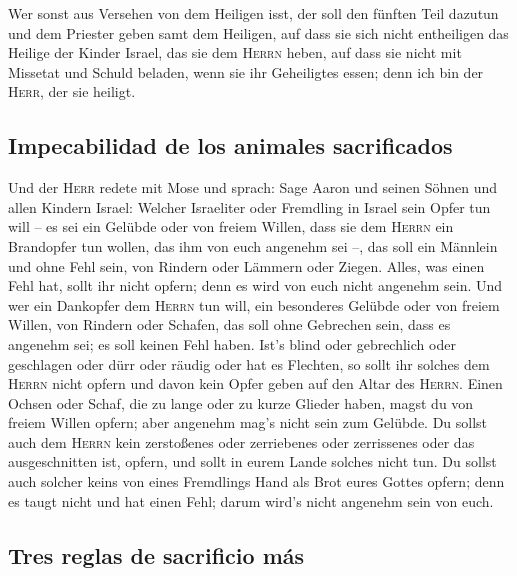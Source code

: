  Wer sonst aus Versehen von dem Heiligen isst, der soll
den fünften Teil dazutun und dem Priester geben samt dem Heiligen,
 auf dass sie sich nicht entheiligen das Heilige der
Kinder Israel, das sie dem \textsc{Herrn} heben,  auf
dass sie nicht mit Missetat und Schuld beladen, wenn sie ihr Geheiligtes
essen; denn ich bin der \textsc{Herr}, der sie heiligt.

\hypertarget{impecabilidad-de-los-animales-sacrificados}{%
\subsection{Impecabilidad de los animales
sacrificados}\label{impecabilidad-de-los-animales-sacrificados}}

 Und der \textsc{Herr} redete mit Mose und sprach:
 Sage Aaron und seinen Söhnen und allen Kindern Israel:
Welcher Israeliter oder Fremdling in Israel sein Opfer tun will -- es
sei ein Gelübde oder von freiem Willen, dass sie dem \textsc{Herrn} ein
Brandopfer tun wollen, das ihm von euch angenehm sei --, 
das soll ein Männlein und ohne Fehl sein, von Rindern oder Lämmern oder
Ziegen.  Alles, was einen Fehl hat, sollt ihr nicht
opfern; denn es wird von euch nicht angenehm sein.  Und
wer ein Dankopfer dem \textsc{Herrn} tun will, ein besonderes Gelübde
oder von freiem Willen, von Rindern oder Schafen, das soll ohne
Gebrechen sein, dass es angenehm sei; es soll keinen Fehl haben.
 Ist's blind oder gebrechlich oder geschlagen oder dürr
oder räudig oder hat es Flechten, so sollt ihr solches dem
\textsc{Herrn} nicht opfern und davon kein Opfer geben auf den Altar des
\textsc{Herrn}.  Einen Ochsen oder Schaf, die zu lange
oder zu kurze Glieder haben, magst du von freiem Willen opfern; aber
angenehm mag's nicht sein zum Gelübde.  Du sollst auch
dem \textsc{Herrn} kein zerstoßenes oder zerriebenes oder zerrissenes
oder das ausgeschnitten ist, opfern, und sollt in eurem Lande solches
nicht tun.  Du sollst auch solcher keins von eines
Fremdlings Hand als Brot eures Gottes opfern; denn es taugt nicht und
hat einen Fehl; darum wird's nicht angenehm sein von euch.

\hypertarget{tres-reglas-de-sacrificio-muxe1s}{%
\subsection{Tres reglas de sacrificio
más}\label{tres-reglas-de-sacrificio-muxe1s}}

